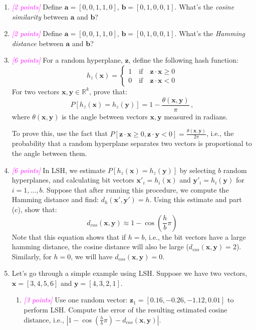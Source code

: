 \documentclass{exam}
\newcommand{\R}{\mathbb{R}} %
\newcommand{\xv}{\mathbf{x}}
\newcommand{\av}{\mathbf{a}}
\newcommand{\bv}{\mathbf{b}}
\newcommand{\yv}{\mathbf{y}}
\newcommand{\zv}{\mathbf{z}}
\newcommand{\grade}[1]{\small\textcolor{magenta}{\emph{[#1 points]}} \normalsize}
\begin{document}
\begin{enumerate}[label=(\alph*)]
    \item\grade{2} Define $\av = [0,0,1,1,0]$, $\bv = [0,1,0,0,1]$. What's the \textit{cosine similarity} between $\av$ and $\bv$?
    

    \vspace{5em}
    \item\grade{2} Define $\av = [0,0,1,1,0]$, $\bv = [0,1,0,0,1]$. What's the \textit{Hamming distance} between $\av$ and $\bv$?
    

    \vspace{1em}
    
    
    \newpage
    \item \grade{6} For a random hyperplane, $\zv$, define the following hash function: 
    $$
h_{z}(\xv) =
\begin{cases}
1 \quad \text{if} \quad \zv \cdot \xv \ge 0  \\
0 \quad \text{if} \quad \zv \cdot \xv < 0
\end{cases}
$$
For two vectors $\xv,\yv \in \R^k$, prove that:
$$P[h_z(\xv) = h_z(\yv)] = 1 - \frac{\theta(\xv,\yv)}{\pi} \, ,$$
where $\theta(\xv,\yv)$ is the angle between vectors $\xv, \yv$ measured in radians. 

To prove this, use the fact that $P[\zv \cdot \xv \ge 0, \zv \cdot \yv < 0 ] = \frac{\theta(\xv,\yv)}{2\pi}$, i.e., the probability that a random hyperplane separates two vectors is proportional to the angle between them. 

\newpage
\item \grade{6} In LSH, we estimate $P[h_z(\xv)=h_z(\yv)]$ by selecting $b$ random hyperplanes, and calculating bit vectors $\xv'_i = h_i(\xv)$ and $\yv'_i = h_i(\yv)$ for $i=1,\dots,b$. Suppose that after running this procedure, we compute the Hamming distance and find: $d_h(\xv',\yv')=h$. Using this estimate and part (c), show that:
$$ d_{cos}(\xv,\yv) \approx 1 - \cos\left(\frac{h}{b} \pi\right)$$
Note that this equation shows that if $h=b$, i.e., the bit vectors have a large hamming distance, the cosine distance will also be large ($d_{cos}(\xv,\yv) = 2$). Similarly, for $h=0$, we will have $d_{cos}(\xv,\yv) = 0$.

    
    \newpage
    \item Let's go through a simple example using LSH. Suppose we have two vectors, $\xv = [3,4,5,6]$ and $\yv=[4,3,2,1]$.
    \begin{enumerate}[label=\roman*.]
        \item \grade{3} Use one random vector: $\zv_1 = [0.16, -0.26, -1.12, 0.01]$ to perform LSH. Compute the error of the resulting estimated cosine distance, i.e., $|1 - \cos\left(\frac{h}{b}\pi\right) - d_{cos}(\xv,\yv)|$. 
        

\end{enumerate}
\end{enumerate}
\end{document}
